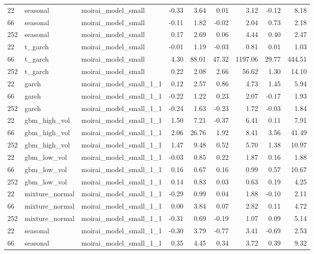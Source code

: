 {\begin{tabular}{lllrrrrrr}
\midrule
22 & seasonal & moirai\_model\_small & -0.33 & 3.64 & 0.01 & 3.12 & -0.12 & 8.18 \\
66 & seasonal & moirai\_model\_small & -0.11 & 1.82 & -0.02 & 2.04 & 0.73 & 2.18 \\
252 & seasonal & moirai\_model\_small & 0.17 & 2.69 & 0.06 & 4.44 & 0.40 & 2.47 \\
\midrule
22 & t\_garch & moirai\_model\_small & -0.01 & 1.19 & -0.03 & 0.81 & 0.01 & 1.03 \\
66 & t\_garch & moirai\_model\_small & 4.30 & 88.01 & 47.32 & 1197.06 & 29.77 & 444.51 \\
252 & t\_garch & moirai\_model\_small & 0.22 & 2.08 & 2.66 & 56.62 & 1.30 & 14.10 \\
\midrule
22 & garch & moirai\_model\_small\_1\_1 & 0.12 & 2.57 & 0.86 & 4.73 & 1.45 & 5.94 \\
66 & garch & moirai\_model\_small\_1\_1 & -0.22 & 1.22 & 0.23 & 2.07 & -0.17 & 1.93 \\
252 & garch & moirai\_model\_small\_1\_1 & -0.24 & 1.63 & -0.23 & 1.72 & -0.03 & 1.84 \\
\midrule
22 & gbm\_high\_vol & moirai\_model\_small\_1\_1 & 1.50 & 7.21 & -0.37 & 6.41 & 0.11 & 7.91 \\
66 & gbm\_high\_vol & moirai\_model\_small\_1\_1 & 2.06 & 26.76 & 1.92 & 8.41 & 3.56 & 41.49 \\
252 & gbm\_high\_vol & moirai\_model\_small\_1\_1 & 1.47 & 9.48 & 0.52 & 5.70 & 1.38 & 10.97 \\
\midrule
22 & gbm\_low\_vol & moirai\_model\_small\_1\_1 & -0.03 & 0.85 & 0.22 & 1.87 & 0.16 & 1.88 \\
66 & gbm\_low\_vol & moirai\_model\_small\_1\_1 & 0.16 & 0.67 & 0.16 & 0.99 & 0.57 & 10.67 \\
252 & gbm\_low\_vol & moirai\_model\_small\_1\_1 & 0.14 & 0.83 & 0.03 & 0.63 & 0.19 & 4.25 \\
\midrule
22 & mixture\_normal & moirai\_model\_small\_1\_1 & -0.29 & 0.99 & 0.04 & 1.88 & -0.10 & 2.11 \\
66 & mixture\_normal & moirai\_model\_small\_1\_1 & 0.00 & 3.84 & 0.07 & 2.82 & 0.11 & 4.72 \\
252 & mixture\_normal & moirai\_model\_small\_1\_1 & -0.31 & 0.69 & -0.19 & 1.07 & 0.09 & 5.14 \\
\midrule
22 & seasonal & moirai\_model\_small\_1\_1 & -0.30 & 3.79 & -0.77 & 3.41 & -0.69 & 2.53 \\
66 & seasonal & moirai\_model\_small\_1\_1 & 0.35 & 4.45 & 0.34 & 3.72 & 0.39 & 9.32 \\

\end{tabular}}
